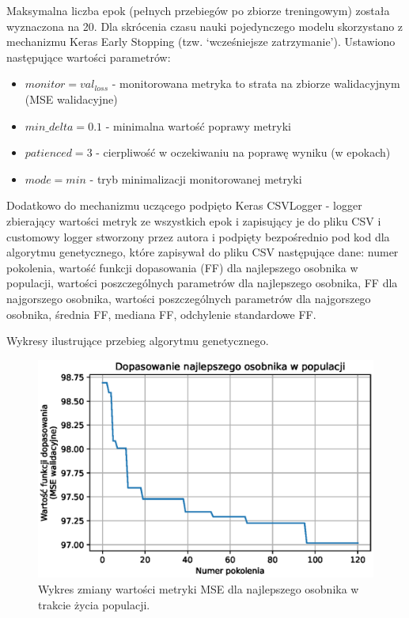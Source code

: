 \documentclass[a4paper,11pt]{article}
\begin{document}
    \bigskip

    Maksymalna liczba epok (pełnych przebiegów po zbiorze treningowym) została wyznaczona na 20. Dla skrócenia czasu nauki pojedynczego modelu skorzystano z mechanizmu Keras Early Stopping (tzw. `wcześniejsze zatrzymanie'). Ustawiono następujące wartości parametrów:
    \begin{itemize}
        \item $monitor = val_{loss}$ - monitorowana metryka to strata na zbiorze walidacyjnym (MSE walidacyjne)
        \item $min\_delta = 0.1$ - minimalna wartość poprawy metryki
        \item $patienced = 3$ - cierpliwość w oczekiwaniu na poprawę wyniku (w epokach)
        \item $mode = min$ - tryb minimalizacji monitorowanej metryki
    \end{itemize}

    \bigskip

    Dodatkowo do mechanizmu uczącego podpięto Keras CSVLogger - logger zbierający wartości metryk ze wszystkich epok i zapisujący je do pliku CSV i customowy logger stworzony przez autora i podpięty bezpośrednio pod kod dla algorytmu genetycznego, które zapisywał do pliku CSV następujące dane: numer pokolenia, wartość funkcji dopasowania (FF) dla najlepszego osobnika w populacji, wartości poszczególnych parametrów dla najlepszego osobnika, FF dla najgorszego osobnika, wartości poszczególnych parametrów dla najgorszego osobnika, średnia FF, mediana FF, odchylenie standardowe FF.

    \bigskip

    Wykresy ilustrujące przebieg algorytmu genetycznego.

    \begin{figure}[H]
        \label{fig:g_a_best_fitness}
        \centering
        \includegraphics[width=\textwidth]{g_a_best_fitness}
        \caption{Wykres zmiany wartości metryki MSE dla najlepszego osobnika w trakcie życia populacji.}
    \end{figure}
\end{document}
